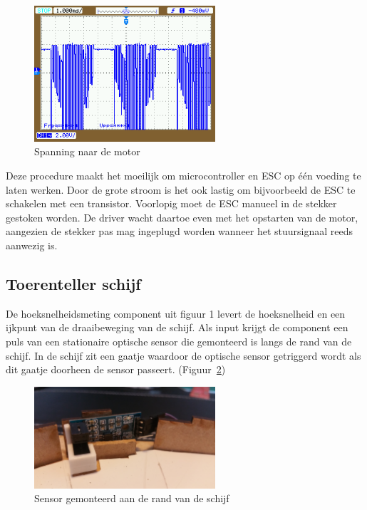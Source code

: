 \documentclass[12pt]{ugentreport}
\begin{document}
\begin{figure}
  \centering
  \includegraphics[width=0.6\textwidth]{img/scoopesc.png}
  \caption{Spanning naar de motor}
  \label{fig:motoresc}
\end{figure}

Deze procedure maakt het moeilijk om microcontroller en ESC op één voeding te
laten werken. Door de grote stroom is het ook lastig om bijvoorbeeld de ESC te
schakelen met een transistor. Voorlopig moet de ESC manueel in de stekker
gestoken worden. De driver wacht daartoe even met het opstarten van de motor,
aangezien de stekker pas mag ingeplugd worden wanneer het stuursignaal reeds
aanwezig is.

\subsection{Toerenteller schijf}
De hoeksnelheidsmeting component uit figuur 1 levert de hoeksnelheid en een
ijkpunt van de draaibeweging van de schijf. Als input krijgt de component een
puls van een stationaire optische sensor die gemonteerd is langs de rand van de
schijf. In de schijf zit een gaatje waardoor de optische sensor getriggerd wordt
als dit gaatje doorheen de sensor passeert. (Figuur~\ref{fig:sensor})

\begin{figure}
  \centering
  \includegraphics[width=0.6\textwidth]{img/Sensor.jpg}
  \caption{Sensor gemonteerd aan de rand van de schijf}
  \label{fig:sensor}
\end{figure}
\end{document}
